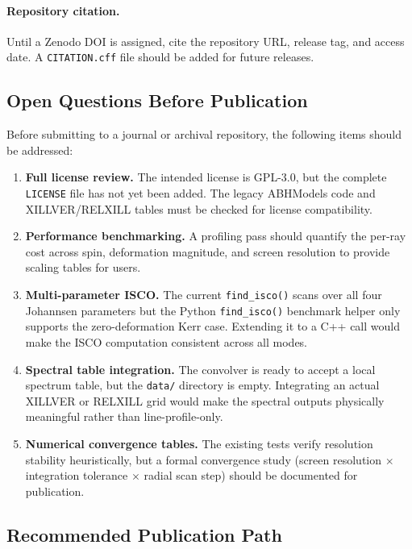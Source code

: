 \documentclass[11pt,twoside]{article}
\begin{document}
\paragraph{Repository citation.}
Until a Zenodo DOI is assigned, cite the repository URL, release tag, and
access date. A \texttt{CITATION.cff} file should be added for future releases.

\subsection{Open Questions Before Publication}

Before submitting to a journal or archival repository, the following items
should be addressed:

\begin{enumerate}[label=\textbf{Q\arabic*.}, leftmargin=1.5em]
\item \textbf{Full license review.} The intended license is GPL-3.0, but the
complete \texttt{LICENSE} file has not yet been added. The legacy ABHModels
code and XILLVER/RELXILL tables must be checked for license compatibility.

\item \textbf{Performance benchmarking.} A profiling pass should quantify
the per-ray cost across spin, deformation magnitude, and screen resolution
to provide scaling tables for users.

\item \textbf{Multi-parameter ISCO.} The current \texttt{find\_isco()}
scans over all four Johannsen parameters but the Python
\texttt{find\_isco()} benchmark helper only supports the zero-deformation
Kerr case. Extending it to a C++ call would make the ISCO computation
consistent across all modes.

\item \textbf{Spectral table integration.} The convolver is ready to accept
a local spectrum table, but the \texttt{data/} directory is empty. Integrating
an actual XILLVER or RELXILL grid would make the spectral outputs physically
meaningful rather than line-profile-only.

\item \textbf{Numerical convergence tables.} The existing tests verify
resolution stability heuristically, but a formal convergence study
(screen resolution $\times$ integration tolerance $\times$ radial scan step)
should be documented for publication.
\end{enumerate}

\subsection{Recommended Publication Path}
\end{document}
